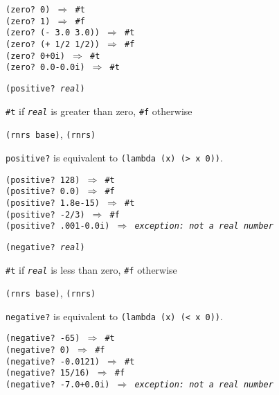 \begin{alltt}
(zero? 0) \(\Rightarrow\) \#{}t
(zero? 1) \(\Rightarrow\) \#{}f
(zero? (- 3.0 3.0)) \(\Rightarrow\) \#{}t
(zero? (+ 1/2 1/2)) \(\Rightarrow\) \#{}f
(zero? 0+0i) \(\Rightarrow\) \#{}t
(zero? 0.0-0.0i) \(\Rightarrow\) \#{}t
\end{alltt}

\begin{description}

\label{objects_s94}\item[procedure] \texttt{(positive? \textit{real})}



\item[returns] \texttt{\#{}t} if \texttt{\textit{real}} is greater than zero, \texttt{\#{}f} otherwise


\item[libraries] \texttt{(rnrs base)}, \texttt{(rnrs)}
\end{description}

\texttt{positive?} is equivalent to \texttt{(lambda (x) (\textgreater{} x 0))}.

\begin{alltt}
(positive? 128) \(\Rightarrow\) \#{}t
(positive? 0.0) \(\Rightarrow\) \#{}f
(positive? 1.8e-15) \(\Rightarrow\) \#{}t
(positive? -2/3) \(\Rightarrow\) \#{}f
(positive? .001-0.0i) \(\Rightarrow\) \textit{exception: not a real number}
\end{alltt}

\begin{description}

\label{objects_s95}\item[procedure] \texttt{(negative? \textit{real})}



\item[returns] \texttt{\#{}t} if \texttt{\textit{real}} is less than zero, \texttt{\#{}f} otherwise


\item[libraries] \texttt{(rnrs base)}, \texttt{(rnrs)}
\end{description}

\texttt{negative?} is equivalent to \texttt{(lambda (x) (\textless{} x 0))}.

\begin{alltt}
(negative? -65) \(\Rightarrow\) \#{}t
(negative? 0) \(\Rightarrow\) \#{}f
(negative? -0.0121) \(\Rightarrow\) \#{}t
(negative? 15/16) \(\Rightarrow\) \#{}f
(negative? -7.0+0.0i) \(\Rightarrow\) \textit{exception: not a real number}
\end{alltt}

